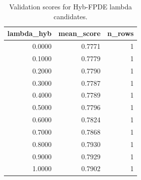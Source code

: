 \begin{table}[t]
\caption{Validation scores for Hyb-FPDE lambda candidates.}
\label{tab:lambda_distribution_computed}
\centering
\begin{tabular}{rrr}
\toprule
lambda\_hyb & mean\_score & n\_rows \\
\midrule
0.0000 & 0.7771 & 1 \\
0.1000 & 0.7779 & 1 \\
0.2000 & 0.7790 & 1 \\
0.3000 & 0.7787 & 1 \\
0.4000 & 0.7789 & 1 \\
0.5000 & 0.7796 & 1 \\
0.6000 & 0.7824 & 1 \\
0.7000 & 0.7868 & 1 \\
0.8000 & 0.7930 & 1 \\
0.9000 & 0.7929 & 1 \\
1.0000 & 0.7902 & 1 \\
\bottomrule
\end{tabular}

\end{table}
